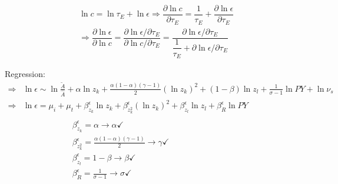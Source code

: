 \documentclass[12pt]{article} %
\begin{document}
\begin{enumerate}
    \begin{eqnarray*}
        &\ln c = \ln \tau_E + \ln \epsilon \Rightarrow \dfrac{\partial \ln c}{\partial \tau_E} = \dfrac{1}{\tau_E} + \dfrac{\partial \ln \epsilon}{\partial \tau_E}\\
        & \Rightarrow \dfrac{\partial \ln \epsilon}{\partial \ln c} = \dfrac{\partial \ln \epsilon / \partial \tau_E}{\partial \ln c/\partial \tau_E} = \dfrac{{\partial \ln \epsilon/\partial \tau_E}}{\dfrac{1}{\tau_E} + {\partial \ln \epsilon/\partial \tau_E}}
    \end{eqnarray*}
  


    Regression:
    \begin{equation*}
        \begin{split}
            \Rightarrow &\ln \epsilon \sim \ln \frac{\tilde{A}}{\hat{A}} + \alpha \ln z_k + \frac{\alpha(1-\alpha)(\gamma-1)}{2} (\ln z_k)^2 + (1-\beta) \ln {{z_l}} + \frac{1}{\sigma -1} \ln PY + \ln \nu_{s} \\
            \Rightarrow& \ln \epsilon = \mu_i + \mu_t + \beta_{z_k}^{\epsilon} \ln z_k + \beta_{z_k^2}^{\epsilon} (\ln z_k)^2 + \beta_{z_l}^{\epsilon} \ln z_l + \beta_{R}^{\epsilon} \ln PY  \\\\
            &     \qquad\qquad\qquad        \beta_{z_k}^{\epsilon} = \alpha \rightarrow \alpha \checkmark\\
            &     \qquad\qquad\qquad        \beta_{z_k^2}^{\epsilon} = \frac{\alpha(1-\alpha)(\gamma-1)}{2}\rightarrow \gamma \checkmark \\
            &     \qquad\qquad\qquad        \beta_{z_l}^{\epsilon} = 1-\beta \rightarrow \beta\checkmark\\
            &     \qquad\qquad\qquad        \beta_{R}^{\epsilon} = \frac{1}{\sigma -1} \rightarrow \sigma \checkmark
        \end{split}
    \end{equation*}



    
\end{enumerate}

\clearpage
\end{document}
